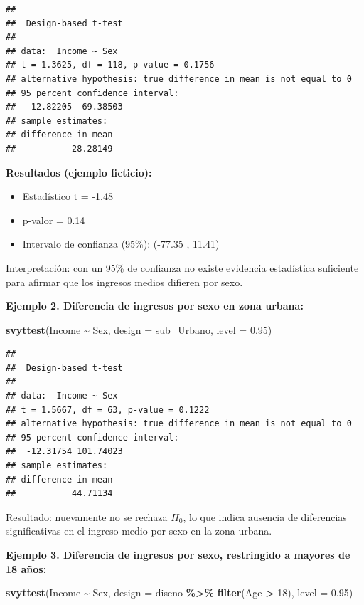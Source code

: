 \documentclass[
  12pt,
]{book}
\newenvironment{Shaded}{\begin{snugshade}}{\end{snugshade}}
\newcommand{\AttributeTok}[1]{\textcolor[rgb]{0.13,0.29,0.53}{#1}}
\newcommand{\DecValTok}[1]{\textcolor[rgb]{0.00,0.00,0.81}{#1}}
\newcommand{\FloatTok}[1]{\textcolor[rgb]{0.00,0.00,0.81}{#1}}
\newcommand{\FunctionTok}[1]{\textcolor[rgb]{0.13,0.29,0.53}{\textbf{#1}}}
\newcommand{\NormalTok}[1]{#1}
\newcommand{\SpecialCharTok}[1]{\textcolor[rgb]{0.81,0.36,0.00}{\textbf{#1}}}
\providecommand{\tightlist}{%
  \setlength{\itemsep}{0pt}\setlength{\parskip}{0pt}}
\begin{document}
\begin{verbatim}
## 
##  Design-based t-test
## 
## data:  Income ~ Sex
## t = 1.3625, df = 118, p-value = 0.1756
## alternative hypothesis: true difference in mean is not equal to 0
## 95 percent confidence interval:
##  -12.82205  69.38503
## sample estimates:
## difference in mean 
##           28.28149
\end{verbatim}

\textbf{Resultados (ejemplo ficticio):}

\begin{itemize}
\tightlist
\item
  Estadístico t = -1.48
\item
  p-valor = 0.14
\item
  Intervalo de confianza (95\%): (-77.35 , 11.41)
\end{itemize}

Interpretación: con un 95\% de confianza no existe evidencia estadística suficiente para afirmar que los ingresos medios difieren por sexo.

\textbf{Ejemplo 2. Diferencia de ingresos por sexo en zona urbana:}

\begin{Shaded}
\begin{Highlighting}[]
\FunctionTok{svyttest}\NormalTok{(Income }\SpecialCharTok{\textasciitilde{}}\NormalTok{ Sex, }\AttributeTok{design =}\NormalTok{ sub\_Urbano, }\AttributeTok{level =} \FloatTok{0.95}\NormalTok{)}
\end{Highlighting}
\end{Shaded}

\begin{verbatim}
## 
##  Design-based t-test
## 
## data:  Income ~ Sex
## t = 1.5667, df = 63, p-value = 0.1222
## alternative hypothesis: true difference in mean is not equal to 0
## 95 percent confidence interval:
##  -12.31754 101.74023
## sample estimates:
## difference in mean 
##           44.71134
\end{verbatim}

Resultado: nuevamente no se rechaza \(H_0\), lo que indica ausencia de diferencias significativas en el ingreso medio por sexo en la zona urbana.

\textbf{Ejemplo 3. Diferencia de ingresos por sexo, restringido a mayores de 18 años:}

\begin{Shaded}
\begin{Highlighting}[]
\FunctionTok{svyttest}\NormalTok{(Income }\SpecialCharTok{\textasciitilde{}}\NormalTok{ Sex,}
         \AttributeTok{design =}\NormalTok{ diseno }\SpecialCharTok{\%\textgreater{}\%} \FunctionTok{filter}\NormalTok{(Age }\SpecialCharTok{\textgreater{}} \DecValTok{18}\NormalTok{),}
         \AttributeTok{level =} \FloatTok{0.95}\NormalTok{)}
\end{Highlighting}
\end{Shaded}
\end{document}
